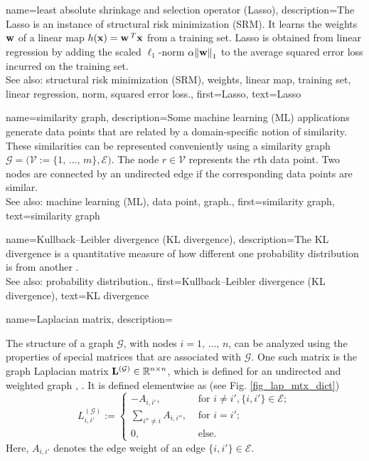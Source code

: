 { 
 {name={least absolute shrinkage and selection operator (Lasso)}, 
	description={The Lasso is an 
		instance of structural risk minimization (SRM). It learns the weights ${\bf w}$ of a linear map 
		$h({\bf x}) = {\bf w}\,^{T} {\bf x}$ from a training set. 
		Lasso is obtained from linear regression by adding the scaled $\ell_{1}$-norm 
		$\alpha \mleft\lVert {\bf w} \mright\rVert_{1}$ to the average squared error loss incurred on the training set. 
				\\
		See also: structural risk minimization (SRM), weights, linear map, training set, linear regression, norm, squared error loss.},
	first={Lasso},
	text={Lasso} 
}
 
 {name={similarity graph}, 
 	description={Some machine learning (ML) applications generate data points that 
 		are related by a domain-specific notion of similarity. These similarities can be 
 		represented conveniently using a similarity graph $\mathcal{G} = \big(\mathcal{V} := \{1, \,\ldots, \,m\}, \mathcal{E}\big)$. 
 		The node $r \in \mathcal{V}$ represents the $r$th data point. Two 
 		nodes are connected by an undirected edge if the corresponding data points are similar. 
				\\
		See also: machine learning (ML), data point, graph.},
 	first={similarity graph},
	text={similarity graph} 
}
 
 
 {name={Kullback–Leibler divergence (KL divergence)}, 
 	description={The KL divergence is a quantitative 
 		 measure of how different one probability distribution is from another \cite{coverthomas}.  
		 		\\
		See also: probability distribution.},
 	first={Kullback–Leibler divergence (KL divergence)},
	text={KL divergence} 
}

{name={Laplacian matrix},
	description={The structure of a graph $\mathcal{G}$, with 
		nodes $i=1, \,\ldots, \,n$, can be analyzed using the properties of 
		special matrices that are associated with $\mathcal{G}$. One such matrix is the 
		graph Laplacian matrix ${\bf L}^{(\mathcal{G})} \in \mathbb{R}^{n \times n}$, 
		which is defined for an undirected and weighted graph \cite{Luxburg2007}, \cite{Ng2001}. 
		It is defined elementwise as (see Fig. \ref{fig_lap_mtx_dict})
		\begin{equation}
			\nonumber
			L^{(\mathcal{G})}_{i,i'} := \begin{cases} - A_{i,i'}, & \mbox{ for } i\neq i', \{i,i'\}\!\in\!\mathcal{E}; \\ 
			\sum\limits_{i'' \neq i} A_{i,i''}, & \mbox{ for } i = i'; \\ 
							0, & \mbox{ else.} \end{cases}
	 	\end{equation}
  		Here, $A_{i,i'}$ denotes the edge weight of an edge $\{i,i'\} \in \mathcal{E}$. 
  		\begin{figure}[H]
  		\begin{center}
   		\begin{minipage}{0.45\textwidth}
		\begin{tikzpicture}
				

\end{tikzpicture}
\end{minipage}
\end{center}
\end{figure}}}}
